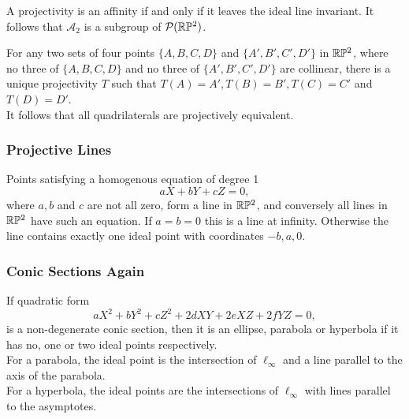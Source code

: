 \begin{theorem}
    A projectivity is an affinity if and only if it leaves the ideal line invariant. It follows that \(\mathcal{A}_2\) is a subgroup of \(\mathcal{P}(\mathbb{R}\mathbb{P}^2)\).
\end{theorem}

\begin{theorem}
    For any two sets of four points \(\{A, B, C, D\}\) and \(\{A', B', C', D'\}\) in \(\mathbb{R}\mathbb{P}^2\), where no three of \(\{A, B, C, D\}\) and no three of \(\{A', B', C', D'\}\) are collinear, there is a unique projectivity \(T\) such that \(T(A) = A', T(B) = B', T(C) = C'\) and \(T(D) = D'\). \\

    It follows that all quadrilaterals are projectively equivalent.
\end{theorem}

\subsubsection{Projective Lines}

\begin{theorem}
    Points satisfying a homogenous equation of degree 1
    \[aX + bY + cZ = 0,\]
    where \(a, b\) and \(c\) are not all zero, form a line in \(\mathbb{R}\mathbb{P}^2\), and conversely all lines in \(\mathbb{R}\mathbb{P}^2\) have such an equation. If \(a = b = 0\) this is a line at infinity. Otherwise the line contains exactly one ideal point with coordinates \(-b, a, 0\).
\end{theorem}

\subsubsection{Conic Sections Again}

\begin{theorem}
    If quadratic form
    \[aX^2 + bY^2 + cZ^2 + 2dXY + 2eXZ + 2fYZ = 0,\]
    is a non-degenerate conic section, then it is an ellipse, parabola or hyperbola if it has no, one or two ideal points respectively. \\

    For a parabola, the ideal point is the intersection of \(\ell_\infty\) and a line parallel to the axis of the parabola. \\

    For a hyperbola, the ideal points are the intersections of \(\ell_\infty\) with lines parallel to the asymptotes.
\end{theorem}